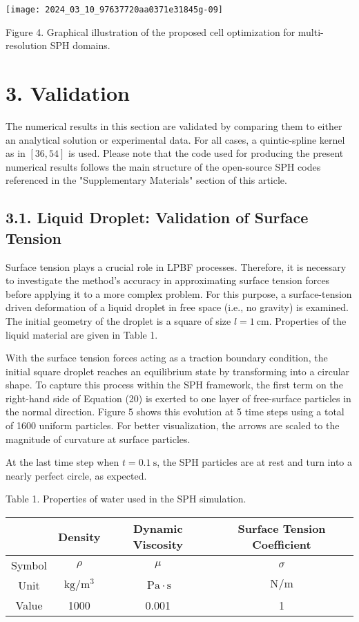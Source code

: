 \documentclass[10pt]{article}
\begin{document}
\begin{center}
\texttt{[image: 2024\_03\_10\_97637720aa0371e31845g-09]}
\end{center}

Figure 4. Graphical illustration of the proposed cell optimization for multi-resolution SPH domains.

\section*{3. Validation}
The numerical results in this section are validated by comparing them to either an analytical solution or experimental data. For all cases, a quintic-spline kernel as in $[36,54]$ is used. Please note that the code used for producing the present numerical results follows the main structure of the open-source SPH codes referenced in the "Supplementary Materials" section of this article.

\subsection*{3.1. Liquid Droplet: Validation of Surface Tension}
Surface tension plays a crucial role in LPBF processes. Therefore, it is necessary to investigate the method's accuracy in approximating surface tension forces before applying it to a more complex problem. For this purpose, a surface-tension driven deformation of a liquid droplet in free space (i.e., no gravity) is examined. The initial geometry of the droplet is a square of size $l=1 \mathrm{~cm}$. Properties of the liquid material are given in Table 1.

With the surface tension forces acting as a traction boundary condition, the initial square droplet reaches an equilibrium state by transforming into a circular shape. To capture this process within the SPH framework, the first term on the right-hand side of Equation (20) is exerted to one layer of free-surface particles in the normal direction. Figure 5 shows this evolution at 5 time steps using a total of 1600 uniform particles. For better visualization, the arrows are scaled to the magnitude of curvature at surface particles.

At the last time step when $t=0.1 \mathrm{~s}$, the SPH particles are at rest and turn into a nearly perfect circle, as expected.

Table 1. Properties of water used in the SPH simulation.

\begin{center}
\begin{tabular}{cccc}
\hline
 & Density & Dynamic Viscosity & Surface Tension Coefficient \\
\hline
Symbol & $\rho$ & $\mu$ & $\sigma$ \\
Unit & $\mathrm{kg} / \mathrm{m}^{3}$ & $\mathrm{~Pa} \cdot \mathrm{s}$ & $\mathrm{N} / \mathrm{m}$ \\
\hline
Value & 1000 & 0.001 & 1 \\
\hline
\end{tabular}
\end{center}
\end{document}
